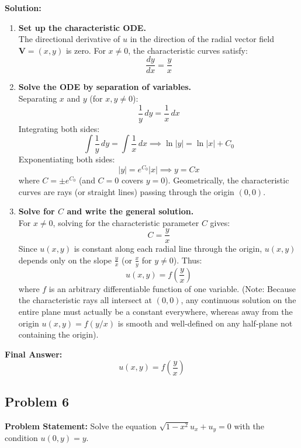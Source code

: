 \documentclass[11pt]{article}
\begin{document}
\textbf{Solution:}
\begin{enumerate}[label=\textbf{Step \arabic*:}]
    \item \textbf{Set up the characteristic ODE.} \\
    The directional derivative of $u$ in the direction of the radial vector field $\mathbf{V} = (x, y)$ is zero. For $x \neq 0$, the characteristic curves satisfy:
    \[
    \frac{dy}{dx} = \frac{y}{x}
    \]

    \item \textbf{Solve the ODE by separation of variables.} \\
    Separating $x$ and $y$ (for $x, y \neq 0$):
    \[
    \frac{1}{y}\,dy = \frac{1}{x}\,dx
    \]
    Integrating both sides:
    \[
    \int \frac{1}{y}\,dy = \int \frac{1}{x}\,dx \implies \ln|y| = \ln|x| + C_0
    \]
    Exponentiating both sides:
    \[
    |y| = e^{C_0}|x| \implies y = Cx
    \]
    where $C = \pm e^{C_0}$ (and $C = 0$ covers $y = 0$). Geometrically, the characteristic curves are rays (or straight lines) passing through the origin $(0, 0)$.

    \item \textbf{Solve for $C$ and write the general solution.} \\
    For $x \neq 0$, solving for the characteristic parameter $C$ gives:
    \[
    C = \frac{y}{x}
    \]
    Since $u(x, y)$ is constant along each radial line through the origin, $u(x, y)$ depends only on the slope $\frac{y}{x}$ (or $\frac{x}{y}$ for $y \neq 0$). Thus:
    \[
    u(x, y) = f\left(\frac{y}{x}\right)
    \]
    where $f$ is an arbitrary differentiable function of one variable. (Note: Because the characteristic rays all intersect at $(0, 0)$, any continuous solution on the entire plane must actually be a constant everywhere, whereas away from the origin $u(x,y) = f(y/x)$ is smooth and well-defined on any half-plane not containing the origin).
\end{enumerate}

\noindent\textbf{Final Answer:}
\[
\boxed{u(x, y) = f\left(\frac{y}{x}\right)}
\]

\hrulefill

\subsection*{Problem 6}
\textbf{Problem Statement:} Solve the equation $\sqrt{1 - x^2}u_x + u_y = 0$ with the condition $u(0, y) = y$.
\end{document}
